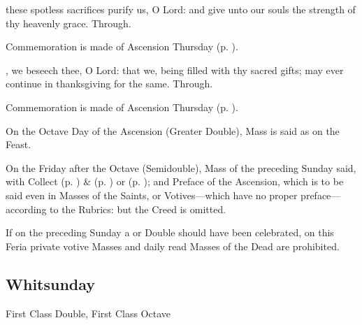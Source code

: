 \secret
{} these spotless sacrifices purify us, O Lord: and give unto our souls the strength of thy heavenly grace. Through.


\begin{rubric}
    Commemoration is made of Ascension Thursday (p. \pageref{AscensionSecret}).
\end{rubric}


\postcommunion
{}, we beseech thee, O Lord: that we, being filled with thy sacred gifts; may ever continue in thanksgiving for the same. Through.


\begin{rubric}
    Commemoration is made of Ascension Thursday (p. \pageref{AscensionPostcommunion}).
\end{rubric}

\begin{rubric}
    On the Octave Day of the Ascension (Greater Double), Mass is said as on the Feast.
\end{rubric}

\begin{rubric}
    On the Friday after the Octave (Semidouble), Mass of the preceding Sunday said, with   Collect  (p. \pageref{SPMaryInEaster}) \&   (p. \pageref{SPAgainst}) or  (p. \pageref{SPChiefBishop});  and Preface of the Ascension, which is to be said even in Masses of the Saints, or Votives---which have no proper preface---according to the Rubrics: but the Creed is omitted.
\end{rubric}
\begin{rubric}
    If on the preceding Sunday a  or  Double should have been celebrated, on this Feria private votive Masses and daily read Masses of the Dead are prohibited.
\end{rubric}


\clearpage
\subsection{Whitsunday}
\begin{inhead}
    {First Class Double, First Class Octave}
\end{inhead}


